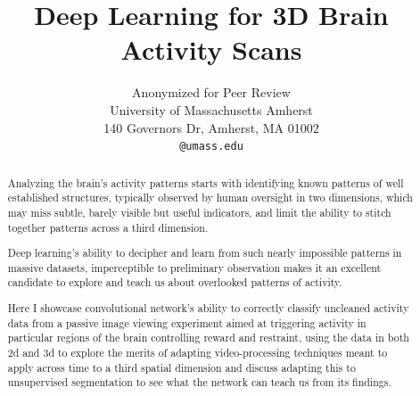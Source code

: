 \documentclass[10pt,twocolumn,letterpaper]{article}
\begin{document}
\title{Deep Learning for 3D Brain Activity Scans}

\author{Anonymized for Peer Review\\
University of Massachusetts Amherst\\
140 Governors Dr, Amherst, MA 01002\\
{\tt\small @umass.edu}
}

\maketitle

\begin{abstract}
 Analyzing the brain's activity patterns starts with identifying known patterns of well established structures,
 typically observed by human oversight in two dimensions, which may miss subtle, barely visible but useful indicators,
 and limit the ability to stitch together patterns across a third dimension.

 Deep learning's ability to decipher and learn from such nearly impossible patterns in massive datasets,
 imperceptible to preliminary observation makes it an excellent candidate to explore and teach us about
 overlooked patterns of activity.

 Here I showcase convolutional network's ability to correctly classify uncleaned activity data from a passive
 image viewing experiment aimed at triggering activity in particular regions of the brain controlling reward and
 restraint, using the data in both 2d and 3d to explore the merits of adapting video-processing techniques meant
 to apply across time to a third spatial dimension and discuss adapting this to unsupervised segmentation to see
 what the network can teach us from its findings.

\end{abstract}







{\small


}
\end{document}
